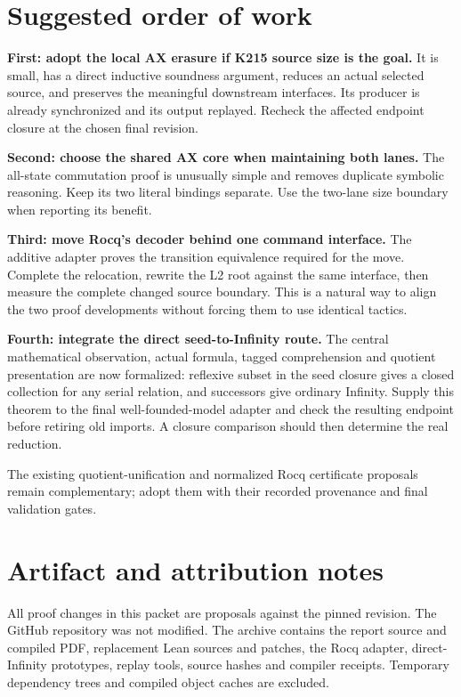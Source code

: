 \documentclass[11pt,letterpaper]{article}
\theoremstyle{definition}\newtheorem{definition}[theorem]{Definition}
\begin{document}
\section{Suggested order of work}

\textbf{First: adopt the local AX erasure if K215 source size is the goal.}
It is small, has a direct inductive soundness argument, reduces an actual selected
source, and preserves the meaningful downstream interfaces. Its producer is
already synchronized and its output replayed. Recheck the affected endpoint closure
at the chosen final revision.

\textbf{Second: choose the shared AX core when maintaining both lanes.}
The all-state commutation proof is unusually simple and removes duplicate
symbolic reasoning. Keep its two literal bindings separate. Use the two-lane
size boundary when reporting its benefit.

\textbf{Third: move Rocq's decoder behind one command interface.}
The additive adapter proves the transition equivalence required for the move.
Complete the relocation, rewrite the L2 root against the same interface, then
measure the complete changed source boundary. This is a natural way to align
the two proof developments without forcing them to use identical tactics.

\textbf{Fourth: integrate the direct seed-to-Infinity route.}
The central mathematical observation, actual formula, tagged comprehension and
quotient presentation are now formalized: reflexive subset in the seed closure
gives a closed collection for any serial relation, and successors give ordinary
Infinity. Supply this theorem to the final well-founded-model adapter and check
the resulting endpoint before retiring old imports. A closure comparison should
then determine the real reduction.

The existing quotient-unification and normalized Rocq certificate proposals
remain complementary; adopt them with their recorded provenance and final
validation gates.

\section*{Artifact and attribution notes}

All proof changes in this packet are proposals against the pinned revision.
The GitHub repository was not modified. The archive contains the report source
and compiled PDF, replacement Lean sources and patches, the Rocq adapter,
direct-Infinity prototypes, replay tools, source hashes and compiler receipts.
Temporary dependency trees and compiled object caches are excluded.
\end{document}
